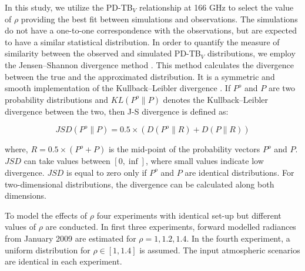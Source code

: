\documentclass[amt, manuscript]{copernicus}
\begin{document}
In this study, we utilize the PD-TB$_V$ relationship at 166\,\,GHz to select the value of $\rho$ providing the best fit between simulations and observations. The simulations do not have a one-to-one correspondence with the observations, but are expected to have a similar statistical distribution. In order to quantify the measure of similarity between the observed and simulated PD-TB$_V$ distributions, we employ the Jensen–Shannon divergence method \citep{}. This method calculates the divergence between the true and the approximated distribution. It is a symmetric and smooth implementation of the Kullback–Leibler divergence \citep{}. If $P^o$ and $P$ are two probability distributions and $KL (P^o \parallel P)$ denotes the Kullback–Leibler divergence between the two, then J-S divergence is defined as:

\begin{equation}
JSD(P^o \parallel P) = 0.5 \times (D(P^o \parallel R)+D(P \parallel R))
\end{equation}

where, $R = 0.5 \times (P^o + P)$ is the mid-point of the probability vectors $P^o$ and $P$. $JSD$ can take values between $[0, \inf]$, where small values indicate low divergence. $JSD$ is equal to zero only if $P^o$ and $P$ are identical distributions. For two-dimensional distributions, the divergence can be calculated along both dimensions.   

To model the effects of $\rho$ four experiments with identical set-up but different values of $\rho$ are conducted. In first three experiments, forward modelled radiances from January 2009 are estimated for $\rho = 1, 1.2, 1.4$. In the fourth experiment, a uniform distribution for $\rho\in[1, 1.4]$ is assumed. The input atmospheric scenarios are identical in each experiment. 
\end{document}
